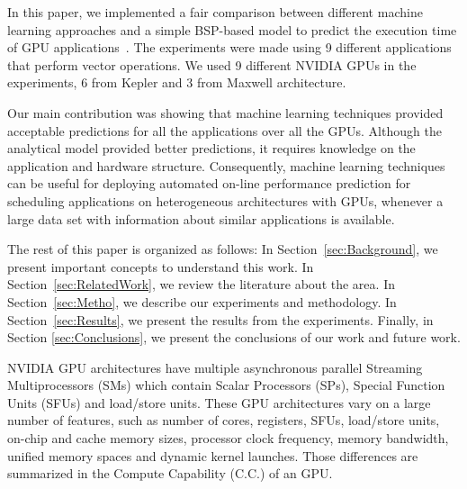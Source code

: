 In this paper, we implemented a fair comparison between different machine learning approaches and a simple BSP-based model to predict the execution time of GPU applications~\cite{BSPGPUCache:2015}. The experiments were made using 9 different applications that perform vector operations. We used 9 different NVIDIA GPUs in the experiments, 6 from Kepler and 3 from Maxwell architecture. 

Our main contribution was showing that machine learning techniques provided acceptable predictions for all the applications over all the GPUs. Although the analytical model provided better predictions, it requires knowledge on the application and hardware structure. Consequently, machine learning techniques can be useful for deploying automated on-line performance prediction for scheduling applications on heterogeneous architectures with GPUs, whenever a large data set with information about similar applications is available.

The rest of this paper is organized as follows: In Section~\ref{sec:Background}, we present important concepts to understand this work. In Section~\ref{sec:RelatedWork}, we review the literature about the area. In Section~\ref{sec:Metho}, we describe our experiments and methodology. In Section~\ref{sec:Results}, we present the results from the experiments. Finally, in Section \ref{sec:Conclusions}, we present the conclusions of our work and future work.


% 

NVIDIA GPU architectures have multiple asynchronous parallel Streaming Multiprocessors (SMs) which contain Scalar Processors (SPs), Special Function Units (SFUs) and load/store units. These GPU architectures vary on a large number of features, such as number of cores, registers, SFUs, load/store units, on-chip and cache memory sizes, processor clock frequency, memory bandwidth, unified memory spaces and dynamic kernel launches. Those differences are summarized in the Compute Capability (C.C.) of an GPU.

